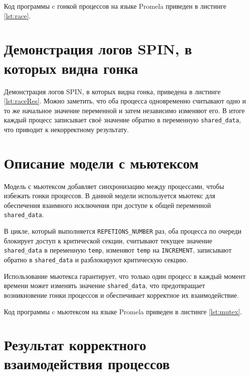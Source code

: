 \documentclass{bmstu}
\begin{document}
\clearpage
Код программы c гонкой процессов на языке Promela приведен в листинге \ref{lst:race}.


\section{Демонстрация логов SPIN, в которых видна гонка}

Демонстрация логов SPIN, в которых видна гонка, приведена в листинге \ref{lst:raceRes}. Можно заметить, что оба процесса одновременно считывают одно и то же начальное значение переменной и затем независимо изменяют его. В итоге каждый процесс записывает своё значение обратно в переменную \texttt{shared\_data}, что приводит к некорректному результату.


\section{Описание модели с мьютексом}

Модель с мьютексом добавляет синхронизацию между процессами, чтобы избежать гонки процессов. В данной модели используется мьютекс для обеспечения взаимного исключения при доступе к общей переменной \texttt{shared\_data}.

В цикле, который выполняется \texttt{REPETIONS\_NUMBER} раз, оба процесса по очереди блокирует доступ к критической секции, считывают текущее значение \texttt{shared\_data} в переменную \texttt{temp}, изменяют \texttt{temp} на \texttt{INCREMENT}, записывают обратно в \texttt{shared\_data} и разблокируют критическую секцию.

Использование мьютекса гарантирует, что только один процесс в каждый момент времени может изменять значение \texttt{shared\_data}, что предотвращает возникновение гонки процессов и обеспечивает корректное их взаимодействие.

Код программы c мьютексом на языке Promela приведен в листинге \ref{lst:mutex}.


\section{Результат корректного взаимодействия процессов}
\end{document}
